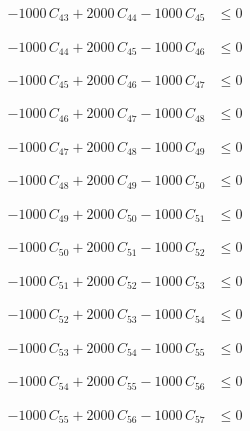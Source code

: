\documentclass[a4paper,11pt]{article}
\begin{document}
\begin{align}
-1000\,C_{43} + 2000\,C_{44} - 1000\,C_{45} &\leq 0 \nonumber
\end{align}

\begin{align}
-1000\,C_{44} + 2000\,C_{45} - 1000\,C_{46} &\leq 0 \nonumber
\end{align}

\begin{align}
-1000\,C_{45} + 2000\,C_{46} - 1000\,C_{47} &\leq 0 \nonumber
\end{align}

\begin{align}
-1000\,C_{46} + 2000\,C_{47} - 1000\,C_{48} &\leq 0 \nonumber
\end{align}

\begin{align}
-1000\,C_{47} + 2000\,C_{48} - 1000\,C_{49} &\leq 0 \nonumber
\end{align}

\begin{align}
-1000\,C_{48} + 2000\,C_{49} - 1000\,C_{50} &\leq 0 \nonumber
\end{align}

\begin{align}
-1000\,C_{49} + 2000\,C_{50} - 1000\,C_{51} &\leq 0 \nonumber
\end{align}

\begin{align}
-1000\,C_{50} + 2000\,C_{51} - 1000\,C_{52} &\leq 0 \nonumber
\end{align}

\begin{align}
-1000\,C_{51} + 2000\,C_{52} - 1000\,C_{53} &\leq 0 \nonumber
\end{align}

\begin{align}
-1000\,C_{52} + 2000\,C_{53} - 1000\,C_{54} &\leq 0 \nonumber
\end{align}

\begin{align}
-1000\,C_{53} + 2000\,C_{54} - 1000\,C_{55} &\leq 0 \nonumber
\end{align}

\begin{align}
-1000\,C_{54} + 2000\,C_{55} - 1000\,C_{56} &\leq 0 \nonumber
\end{align}

\begin{align}
-1000\,C_{55} + 2000\,C_{56} - 1000\,C_{57} &\leq 0 \nonumber
\end{align}
\end{document}
